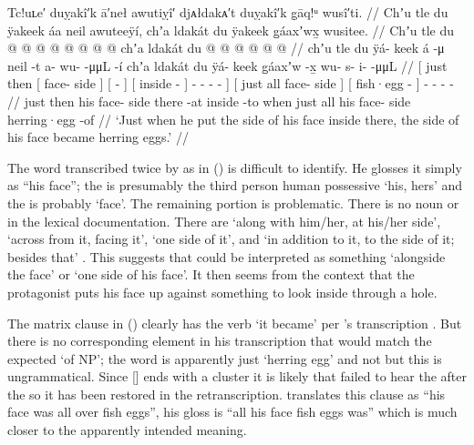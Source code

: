 \ex\label{ex:100-55-show-face-dancing}%
%
\begingl
	\glpreamble	Tc!uʟe′ duỵakî′k ā′neł awutiỵî′ djᴀłdakᴀ′t duỵakî′k g̣āq!ᵘ wusî′ti. //
	\glpreamble	Chʼu tle du ÿakeek áa neil awuteeÿí, chʼa ldakát du ÿakeek g̱áaxʼwx̱ wusitee. //
	\gla	{} Chʼu tle
			{} du  @ {} {}
			{}  @ {} {}
			{}  @ {} {}
			 @ {} @ {} @ {} @ {} @ {}
		{} chʼa ldakát du  @ {} {}
		{}  @ {} {}
		 @ {} @ {} @ {} @ {} //
	\glb	{} chʼu tle
			{} du ÿá- keek {}
			{} á -μ {}
			{} neil -t {}
			a- wu-  -μμL -í {}
		{} chʼa ldakát du ÿá- keek {}
		{} g̱áaxʼw -x̱ {}
		wu- s- i-  -μμL //
	\glc	{}[ just then
			{}[  face- side {}]
			{}[  - {}]
			{}[ inside - {}]
			- -  - - {}]
		{}[ just all  face- side {}]
		{}[ fish·egg - {}]
		- - -  - //
	\gld	{} just then
			{} his face- side {}
			{} there -at {}
			{} inside -to {}
			 {} {} {} when {}
		{} just all his face- side {}
		{} herring·egg -of {}
		 {} {} {} {} //
	\glft	‘Just when he put the side of his face inside there, the side of his face became herring eggs.’
		//
\endgl
\xe

The word transcribed twice by \citeauthor{swanton:1909} as  in (\lastx) is difficult to identify.
He glosses it simply as “his face”; the  is presumably the third person human possessive  ‘his, hers’ and the  is probably  ‘face’.
The remaining portion  is problematic.
There is no noun  or  in the lexical documentation.
There are  ‘along with him/her, at his/her side’,  ‘across from it, facing it’,  ‘one side of it’, and  ‘in addition to it, to the side of it; besides that’ \parencites[f06/123]{leer:1973}[\textsc{t}·38]{leer:2001}.
This suggests that  could be interpreted as something ‘alongside the face’ or ‘one side of his face’.
It then seems from the context that the protagonist puts his face up against something to look inside through a hole.

The matrix clause in (\lastx) clearly has the verb  ‘it became’ per \citeauthor{swanton:1909}’s transcription .
But there is no corresponding element in his transcription that would match the expected  ‘of NP’; the word  is apparently just  ‘herring egg’ and not  but this is ungrammatical.
Since  [] ends with a cluster it is likely that \citeauthor{swanton:1909} failed to hear the  after the  so it has been restored in the retranscription.
\citeauthor{swanton:1909} translates this clause as “his face was all over fish eggs”, his gloss is “all his face fish eggs was” which is much closer to the apparently intended meaning.

